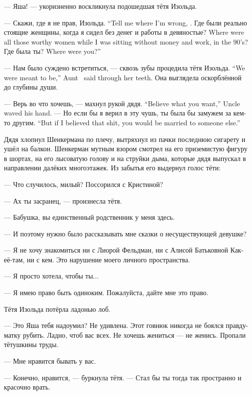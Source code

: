 --- Яша! --- укоризненно воскликнула подошедшая тётя Изольда.

{--- Скажи, где я не прав, Изольда.}
{``Tell me where I'm wrong, \Izolda.}
{Где были реально стоящие женщины, когда я сидел без денег и работы в девяностые?}
{Where were all those worthy women while I was sitting without money and work, in the 90's?}
{Где была ты?}
{Where were you?''}

{--- Нам было суждено встретиться, --- сквозь зубы процедила тётя Изольда.}
{``We were meant to be,'' Aunt \Izolda\ said through her teeth.}
Она выглядела оскорблённой до глубины души.

{--- Верь во что хочешь, --- махнул рукой дядя.}
{``Believe what you want,'' Uncle waved his hand.}
{--- Но если бы я верил в эту чушь, ты была бы замужем за кем-то другим.}
{``But if I believed that shit, you would be married to someone else.''}

Дядя хлопнул Шенкермана по плечу, вытряхнул из пачки последнюю сигарету и ушёл на балкон.
Шенкерман мутным взором смотрел на его приземистую фигуру в шортах, на его лысоватую голову и на струйки дыма, которые дядя выпускал в направлении далёких многоэтажек.
Из забытья его выдернул голос тёти:

--- Что случилось, милый?
Поссорился с Кристиной?

\asterism

--- Ах ты засранец, --- произнесла тётя.

--- Бабушка, вы единственный родственник у меня здесь.

--- И поэтому нужно было рассказывать мне сказки о несуществующей девушке?

--- Я не хочу знакомиться ни с Лиорой Фельдман, ни с Алисой Батьковной Как-её-там, ни с кем.
Это нарушение моего личного пространства.

--- Я просто хотела, чтобы ты...

--- Я имею право быть одиноким.
Пожалуйста, дайте мне это право.

Тётя Изольда потёрла ладонью лоб.

--- Это Яша тебя надоумил?
Не удивлена.
Этот говнюк никогда не боялся правду-матку рубить.
Ладно, чтоб вас всех.
Не хочешь жениться --- не женись.
Пропали тётушкины труды.

--- Мне нравится бывать у вас.

--- Конечно, нравится, --- буркнула тётя.
--- Стал бы ты тогда так пространно и красочно врать.

